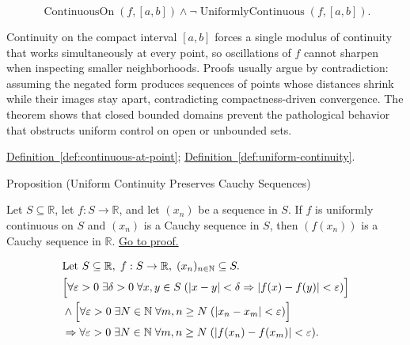 \begin{remark*}
\[
\operatorname{ContinuousOn}(f,[a,b]) \land \neg \operatorname{UniformlyContinuous}(f,[a,b]).
\]
\end{remark*}

\begin{remark*}[Interpretation]
Continuity on the compact interval $[a,b]$ forces a single modulus of continuity that works simultaneously at every point, so oscillations of $f$ cannot sharpen when inspecting smaller neighborhoods. Proofs usually argue by contradiction: assuming the negated form produces sequences of points whose distances shrink while their images stay apart, contradicting compactness-driven convergence. The theorem shows that closed bounded domains prevent the pathological behavior that obstructs uniform control on open or unbounded sets.
\end{remark*}

\begin{dependencies}
\hyperref[def:continuous-at-point]{Definition~\ref*{def:continuous-at-point}};\;
\hyperref[def:uniform-continuity]{Definition~\ref*{def:uniform-continuity}}.
\end{dependencies}


\begin{propositionbox}{Proposition (Uniform Continuity Preserves Cauchy Sequences)}
\begin{proposition}
\label{prop:uniform-continuity-cauchy}
Let $S \subseteq \mathbb{R}$, let $f:S \to \mathbb{R}$, and let $(x_n)$ be a sequence in $S$. If $f$ is uniformly continuous on $S$ and $(x_n)$ is a Cauchy sequence in $S$, then $(f(x_n))$ is a Cauchy sequence in $\mathbb{R}$.
\hyperref[prf:uniform-continuity-cauchy]{Go to proof.}
\end{proposition}
\end{propositionbox}

\begin{remark*}
\[
\begin{aligned}
&\text{Let } S \subseteq \mathbb{R},\; f:S \to \mathbb{R},\; (x_n)_{n\in\mathbb{N}}\subseteq S.\\
&\Bigl[\forall \varepsilon>0\;\exists \delta>0\;\forall x,y \in S\;( |x-y|<\delta \Rightarrow |f(x)-f(y)|<\varepsilon )\Bigr]\\
&\land \Bigl[\forall \varepsilon>0\;\exists N \in \mathbb{N}\;\forall m,n \ge N\;( |x_n - x_m|<\varepsilon )\Bigr]\\
&\Rightarrow \forall \varepsilon>0\;\exists N \in \mathbb{N}\;\forall m,n \ge N\;( |f(x_n) - f(x_m)|<\varepsilon ).
\end{aligned}
\]
\end{remark*}

